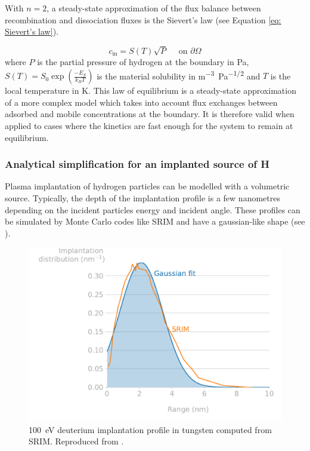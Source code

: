 With $n=2$, a steady-state approximation of the flux balance between recombination and dissociation fluxes is the Sievert's law (see Equation \ref{eq: Sievert's law}).

\begin{equation}
    c_\mathrm{m} = S(T) \sqrt{P}\quad \text { on } \partial \Omega
    \label{eq: Sievert's law}
\end{equation}
where $P$ is the partial pressure of hydrogen at the boundary in \si{Pa}, $S(T)=S_0 \exp(\frac{-E_S}{k_B T})$ is the material solubility in \si{m^{-3}.Pa^{-1/2}} and $T$ is the local temperature in \si{K}.
This law of equilibrium is a steady-state approximation of a more complex model which takes into account flux exchanges between adsorbed and mobile concentrations at the boundary.
It is therefore valid when applied to cases where the kinetics are fast enough for the system to remain at equilibrium.

\subsubsection{Analytical simplification for an implanted source of H} \label{triangle model}

Plasma implantation of hydrogen particles can be modelled with a volumetric source.
Typically, the depth of the implantation profile is a few nanometres depending on the incident particles energy and incident angle.
These profiles can be simulated by Monte Carlo codes like SRIM  and have a gaussian-like shape  (see ).

\begin{figure}
    \centering
    \includegraphics[width=\linewidth]{Figures/Chapter1/srim_implantation_range.pdf}
    \caption{\SI{100}{eV} deuterium implantation profile in tungsten computed from SRIM. Reproduced from \cite{shimada_improved_2019}.}
\end{figure}

